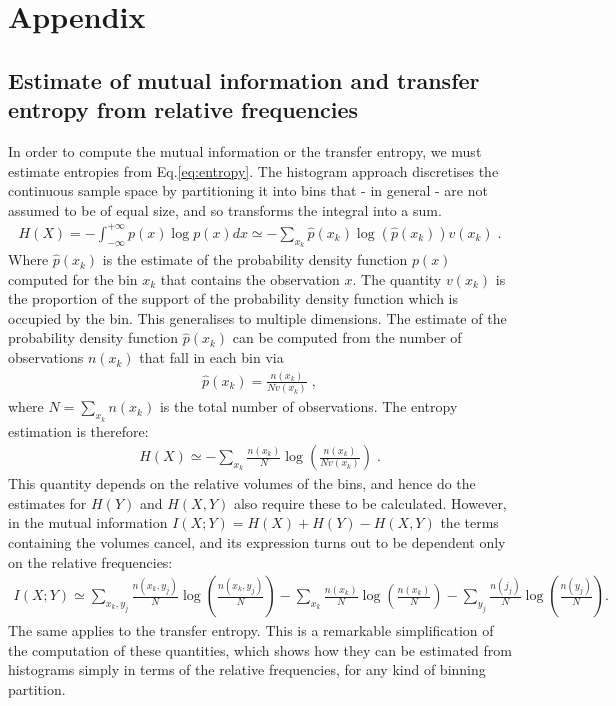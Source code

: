 \documentclass[]{rsos}%
\begin{document}


\section{Appendix}

 \subsection{Estimate of mutual information and transfer entropy from relative frequencies}
 In order to compute the mutual information or the transfer entropy, we must estimate entropies from Eq.\ref{eq:entropy}.
 The histogram approach discretises the continuous sample space by partitioning it into bins that - in general - are not assumed to be of equal size, and so transforms the integral into a sum.
  \begin{eqnarray}
    \label{eq:entropyDiscrere}
    H(X) = - \int_{-\infty}^{+\infty}  {  p(x) \log{  p(x)}  } dx \simeq - \sum_{x_k}  \hat p(x_k) \log\left({ \hat p(x_k)}\right) v(x_k)\;.
  \end{eqnarray}
Where $\hat p(x_k)$ is the estimate of the probability density function $p(x)$ computed for the bin $x_k$ that contains the observation $x$.
The quantity $v(x_k)$ is the proportion of the support of the probability density function which is occupied by the bin. This generalises to multiple dimensions.
The estimate of the probability density function $\hat p(x_k)$ can be computed from the number of observations $n(x_k)$ that fall in each bin via
    \begin{eqnarray}
    \label{eq:pdfDiscrere}
 \hat p(x_k) = \frac{n(x_k)}{N v(x_k)}\;,
  \end{eqnarray}
where $N=\sum_{x_k} n(x_k)$ is the total number of observations. 
The entropy estimation is therefore:
  \begin{eqnarray}
    \label{eq:entropyDiscrere1}
    H(X) \simeq - \sum_{x_k}   \frac{n(x_k)}{N } \log\left({  \frac{n(x_k)}{N v(x_k)} }\right) \;.
  \end{eqnarray}
This quantity depends on the relative volumes of the bins, and hence do the estimates for $H(Y)$ and $H(X,Y)$ also require these to be calculated. However, in the mutual information $I(X;Y) = H(X)+H(Y)-H(X,Y)$ the terms containing the volumes cancel, and its expression turns out to be dependent only on the relative frequencies:
  \begin{eqnarray}
    \label{eq:mutualnfoDiscrere}
  I(X;Y) \! \simeq \!
 \! \!\sum_{x_k,y_j} \!\!\frac{n(x_k,y_j)}{N } \log\left({  \frac{n(x_k,y_j)}{N} }\right)
   -\! \sum_{x_k}      \! \frac{n(x_k)}{N } \log\left({  \frac{n(x_k)}{N} }\right) 
  - \!\sum_{y_j}        \!\frac{n(j_j)}{N } \log\left({  \frac{n(y_j)}{N} }\right) .
  \end{eqnarray}
  The same applies to the transfer entropy. 
  This is a remarkable simplification of the computation of these quantities, which shows how they can be estimated from histograms simply in terms of the relative frequencies, for any kind of binning partition.
 
\end{document}

